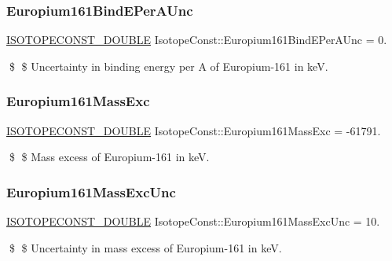 \subsubsection{\texorpdfstring{Europium161\+Bind\+E\+Per\+A\+Unc}{Europium161BindEPerAUnc}}
{\footnotesize\ttfamily \mbox{\hyperlink{group___isotope_const-_macros_ga8f45a7272ce02c0b4c65c44636ed719a}{I\+S\+O\+T\+O\+P\+E\+C\+O\+N\+S\+T\+\_\+\+D\+O\+U\+B\+LE}} Isotope\+Const\+::\+Europium161\+Bind\+E\+Per\+A\+Unc = 0.}

\$ \$ Uncertainty in binding energy per A of Europium-\/161 in keV. \mbox{\label{group___isotope_const-_europium-_eu161_ga845b5ac37642bb67b3b6be4068cde093}} 
\subsubsection{\texorpdfstring{Europium161\+Mass\+Exc}{Europium161MassExc}}
{\footnotesize\ttfamily \mbox{\hyperlink{group___isotope_const-_macros_ga8f45a7272ce02c0b4c65c44636ed719a}{I\+S\+O\+T\+O\+P\+E\+C\+O\+N\+S\+T\+\_\+\+D\+O\+U\+B\+LE}} Isotope\+Const\+::\+Europium161\+Mass\+Exc = -\/61791.}

\$ \$ Mass excess of Europium-\/161 in keV. \mbox{\label{group___isotope_const-_europium-_eu161_ga678170ed66a5f1aaeca4996779f5c35c}} 
\subsubsection{\texorpdfstring{Europium161\+Mass\+Exc\+Unc}{Europium161MassExcUnc}}
{\footnotesize\ttfamily \mbox{\hyperlink{group___isotope_const-_macros_ga8f45a7272ce02c0b4c65c44636ed719a}{I\+S\+O\+T\+O\+P\+E\+C\+O\+N\+S\+T\+\_\+\+D\+O\+U\+B\+LE}} Isotope\+Const\+::\+Europium161\+Mass\+Exc\+Unc = 10.}

\$ \$ Uncertainty in mass excess of Europium-\/161 in keV. \mbox{\label{group___isotope_const-_europium-_eu161_ga348bc83f509691f9696b8c0420e5daf1}} 

